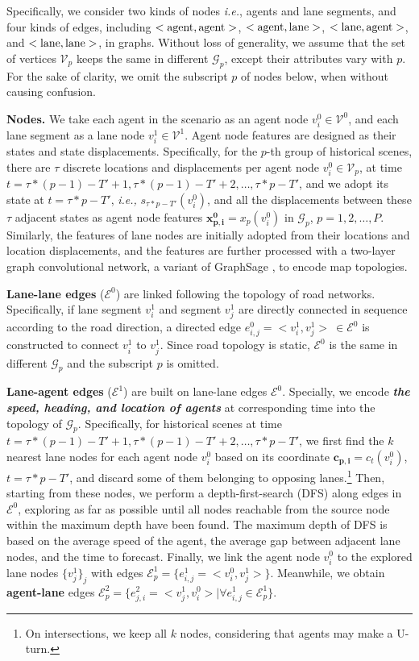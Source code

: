 \documentclass[letterpaper, 10 pt, conference]{ieeeconf}
\begin{document}
Specifically, we consider two kinds of nodes  \textit{i.e.}, agents and lane segments,  and four kinds of edges, including $<{\rm agent}, {\rm agent}>$, $<{\rm agent}, {\rm lane}>$, $<{\rm lane}, { \rm agent}>$, and $< {\rm lane}, {\rm lane}>$, in graphs. Without loss of generality, we assume that the set of vertices $\mathcal{V}_p$  keeps the same in different $\mathcal{G}_p$, except their attributes vary with $p$.  For the sake of clarity, we omit the subscript $p$ of nodes  below,  when without causing confusion.

\textbf{Nodes.} We take each agent in the scenario as an agent node $v^0_i \in \mathcal{V}^0$, and each lane segment as a lane node $v^1_i \in \mathcal{V}^1$. 
Agent node features are designed as  their states 
and state displacements. Specifically, for the $p$-th group of historical scenes, there are $\tau$ discrete locations and displacements per agent node $v_i^0 \in \mathcal{V}_p$,  at time  $t= \tau*(p-1)-T'+1, \tau*(p-1)-T'+2, \dots,  \tau*p-T'$, and we adopt its state at $t=\tau*p-T'$, \emph{i.e.,} $s_{\tau*p-T'}(v_i^0)$, and all the displacements between these $\tau$ adjacent states as agent node features $\bm{x_{p,i}^0}=x_p(v_i^0)$ in $\mathcal{G}_p$, $p=1, 2,\dots,P$.
Similarly, the features of lane nodes are initially adopted from their locations and location displacements, and the features are further processed with a two-layer graph convolutional network,  a variant of GraphSage \cite{hamilton2017inductive}, to encode map topologies.

\textbf{Lane-lane edges} ($\mathcal{E}^0$) are linked following the topology of road networks. Specifically, if  lane segment $v_i^1$ and  segment  $v_j^1$ are directly connected in sequence according to the road direction, a directed edge $e_{i,j}^0= <v_i^1, v_j^1> \ \in \mathcal{E}^0$ is constructed to connect $v_i^1$ to $v_j^1$. Since road topology is static,  $\mathcal{E}^0$ is the same in different $\mathcal{G}_p$ and the subscript $p$ is omitted.

\textbf{Lane-agent edges} ($\mathcal{E}^1$) are built on lane-lane edges $\mathcal{E}^0$. Specially, we encode \textbf{\textit{the speed, heading, and location of agents}} at corresponding time into the topology of $\mathcal{G}_p$. Specifically, for historical scenes at time $t= \tau*(p-1)-T'+1, \tau*(p-1)-T'+2, \dots,  \tau*p-T'$,  we first find the $k$ nearest lane nodes for each agent node $v_i^0$ based on  its coordinate $\bm{c_{p,i}}=c_t(v_i^0)$,  $t=\tau*p-T'$, and discard some of them belonging to opposing lanes.\footnote{On intersections, we keep all $k$ nodes, considering that agents may make a U-turn.} Then, starting from these nodes, we perform a depth-first-search (DFS) along edges in $\mathcal{E}^0$, exploring as far as possible until all nodes reachable from the source node within the maximum depth have been found. The maximum depth of DFS is based on the average speed of the agent, the average gap between adjacent lane nodes, and the time to forecast. Finally, we link the agent node $v_i^0$ to the explored lane nodes $\{ v_j^1\}_j$ with edges $\mathcal{E}^1_p=\{e_{i,j}^1=<v_i^0,v_j^1 > \}$. Meanwhile, we obtain \textbf{agent-lane} edges $\mathcal{E}^2_p= \{e_{j,i}^2=<v_j^1, v_i^0> | \forall e_{i,j}^1 \in \mathcal{E}^1_p \}$.
\end{document}
